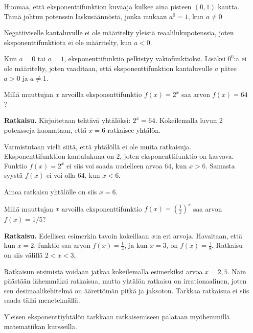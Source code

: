 Huomaa, että eksponenttifunktion kuvaaja kulkee aina pisteen $(0,1)$ kautta. Tämä johtuu potenssin laskusäännöstä, jonka mukaan $a^{0}=1$, kun $a\neq0$

Negatiiviselle kantaluvulle ei ole määritelty yleistä reaalilukupotenssia, 
joten eksponenttifunktiota ei ole määritelty, kun $a < 0$. 

Kun $a=0$ tai $a=1$, eksponenttifunktio pelkistyy vakiofunktioksi.
Lisäksi $0^0$:a ei ole määritelty, joten vaaditaan, että
eksponenttifunktion kantaluvulle $a$ pätee $a>0$ ja $a \neq 1$.


\begin{esimerkki}
Millä muuttujan $x$ arvoilla eksponenttifunktio $f(x) = 2^x$ saa arvon
$f(x) = 64$?

\textbf{Ratkaisu.}
Kirjoitetaan tehtävä yhtälöksi: $2^x = 64$. Kokeilemalla luvun $2$ potensseja huomataan,
että $x = 6$ ratkaisee yhtälön.

Varmistutaan vielä siitä, että yhtälöllä ei ole muita ratkaisuja.
Eksponenttifunktion kantalukuna on $2$, joten eksponenttifunktio on
kasvava. Funktio $f(x) = 2^x$ ei siis voi saada uudelleen arvoa $64$,
kun $x > 6$. Samasta syystä $f(x)$ ei voi olla $64$, kun $x < 6$.

Ainoa ratkaisu yhtälölle on siis $x = 6$.
\end{esimerkki}

\begin{esimerkki}
Millä muuttujan $x$ arvoilla eksponenttifunktio
$f(x) = \left( \frac{1}{2} \right)^{x}$ saa arvon
$f(x) = 1/5$?

\textbf{Ratkaisu.}
Edellisen esimerkin tavoin kokeillaan $x$:n eri arvoja. Havaitaan,
että kun $x = 2$, funktio saa arvon $f(x) = \frac{1}{4}$, ja
kun $x = 3$, on $f(x) = \frac{1}{8}$. Ratkaisu on siis välillä
$2 < x < 3$.

Ratkaisun etsimistä voidaan jatkaa kokeilemalla esimerkiksi
arvoa $x = 2,5$. Näin päästään lähemmäksi ratkaisua, mutta
yhtälön ratkaisu on irrationaalinen, joten sen desimaalikehitelmä
on äärettömän pitkä ja jaksoton. Tarkkaa ratkaisua ei siis saada tällä menetelmällä.

\end{esimerkki}

Yleisen eksponenttiyhtälön tarkkaan ratkaisemiseen palataan myöhemmillä
matematiikan kursseilla.



